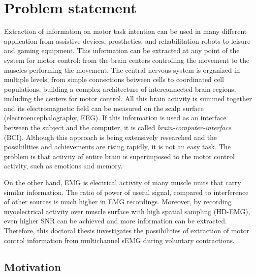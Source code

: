 \chapter{Problem statement}

Extraction of information on motor task intention can be used in many different application from assistive devices, prosthetics, and rehabilitation robots to leisure and gaming equipment. This information can be extracted at any point of the system for motor control: from the brain centers controlling the movement to the muscles performing the movement. The central nervous system is organized in multiple levels, from simple connections between cells to coordinated cell populations, building a complex architecture of interconnected brain regions, including the centers for motor control. All this brain activity is summed together and its electromagnetic field can be measured on the scalp surface (electroencephalography, EEG). If this information is used as an interface between the subject and the computer, it is called \emph{brain-computer-interface} (BCI). Although this approach is being extensively researched and the possibilities and achievements are rising rapidly, it is not an easy task. The problem is that activity of entire brain is superimposed to the motor control activity, such as emotions and memory.

On the other hand, EMG is electrical activity of many muscle units that carry similar information. The ratio of power of useful signal, compared to interference of other sources is much higher in EMG recordings. Moreover, by recording myoelectrical activity over muscle surface with high spatial sampling (HD-EMG), even higher SNR can be achieved and more information can be extracted. Therefore, this doctoral thesis investigates the possibilities of extraction of motor control information from multichannel sEMG during voluntary contractions.

    
    
    \section{Motivation}
    
